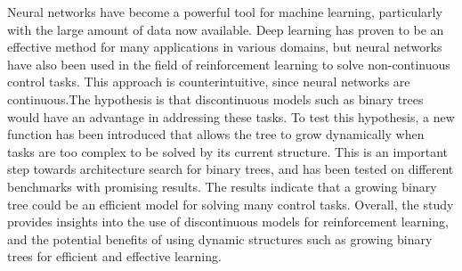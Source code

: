 
Neural networks have become a powerful tool for machine learning, particularly with the large amount of data now available. Deep learning has proven to be an effective method for many applications in various domains, but neural networks have also been used in the field of reinforcement learning to solve non-continuous control tasks. This approach is counterintuitive, since neural networks are continuous.The hypothesis is that discontinuous models such as binary trees would have an advantage in addressing these tasks. To test this hypothesis, a new function has been introduced that allows the tree to grow dynamically when tasks are too complex to be solved by its current structure. This is an important step towards architecture search for binary trees, and has been tested on different benchmarks with promising results. The results indicate that a growing binary tree could be an efficient model for solving many control tasks.
Overall, the study provides insights into the use of discontinuous models for reinforcement learning, and the potential benefits of using dynamic structures such as growing binary trees for efficient and effective learning.